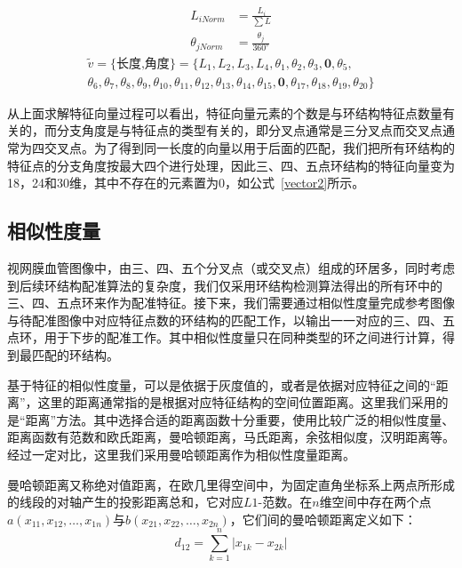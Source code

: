  \begin{equation}
 \begin{split}
L_{iNorm}&=\frac{L_i}{\sum{L}}\\
\theta_{jNorm}&=\frac{\theta_j}{360^\circ}
\end{split}
\label{length-angle}
\end{equation}	 	
 \begin{equation}
 \begin{split}
\tilde{v}=\{\textrm{长度,角度}\}=\{L_{1},L_{2},L_{3},L_{4},\theta_{1},\theta_{2},\theta_{3},\mathbf{0},\theta_{5},\\\theta_{6},\theta_{7},\theta_{8},\theta_{9},\theta_{10},\theta_{11},\theta_{12},\theta_{13},\theta_{14},\theta_{15},\mathbf{0},\theta_{17},\theta_{18},\theta_{19},\theta_{20}\}
\label{vector2}
 \end{split}
 \end{equation}
	 		 	
从上面求解特征向量过程可以看出，特征向量元素的个数是与环结构特征点数量有关的，而分支角度是与特征点的类型有关的，即分叉点通常是三分叉点而交叉点通常为四交叉点。为了得到同一长度的向量以用于后面的匹配，我们把所有环结构的特征点的分支角度按最大四个进行处理，因此三、四、五点环结构的特征向量变为18，24和30维，其中不存在的元素置为0，如公式~\ref{vector2}所示。

\subsection{相似性度量}
视网膜血管图像中，由三、四、五个分叉点（或交叉点）组成的环居多，同时考虑到后续环结构配准算法的复杂度，我们仅采用环结构检测算法得出的所有环中的三、四、五点环来作为配准特征。接下来，我们需要通过相似性度量完成参考图像与待配准图像中对应特征点数的环结构的匹配工作，以输出一一对应的三、四、五点环，用于下步的配准工作。其中相似性度量只在同种类型的环之间进行计算，得到最匹配的环结构。

基于特征的相似性度量，可以是依据于灰度值的，或者是依据对应特征之间的“距离”，这里的距离通常指的是根据对应特征结构的空间位置距离。这里我们采用的是“距离”方法。其中选择合适的距离函数十分重要，使用比较广泛的相似性度量、距离函数有范数和欧氏距离，曼哈顿距离，马氏距离，余弦相似度，汉明距离等。经过一定对比，这里我们采用曼哈顿距离作为相似性度量距离。

曼哈顿距离又称绝对值距离，在欧几里得空间中，为固定直角坐标系上两点所形成的线段的对轴产生的投影距离总和，它对应$L1$-范数。在$n$维空间中存在两个点$a(x_{11},x_{12},\ldots,x_{1n})$与$b(x_{21},x_{22},\ldots,x_{2n})$，它们间的曼哈顿距离定义如下：
\begin{equation}
d_{12}=\sum_{k=1}^n|x_{1k}-x_{2k}|
\end{equation}

